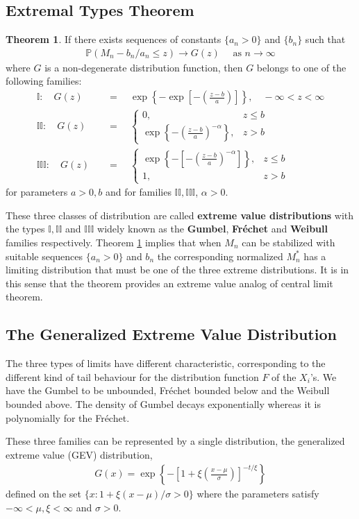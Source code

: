 \documentclass[a4paper,10pt]{article}
\theoremstyle{definition}
\newtheorem{thm}{Theorem}[section]
\numberwithin{equation}{section}
\begin{document}
\subsection{Extremal Types Theorem}

\begin{thm}\label{thm:gfw}
If there exists sequences of constants $\{a_n>0\}$ and $\{b_n\}$ such that 
\begin{align*}
\mathbb{P}(M_n-b_n/a_n \leq z) \to G(z) \quad \text{ as } n \to \infty
\end{align*}
where $G$ is a non-degenerate distribution function, then $G$ belongs to one of the following families:
\begin{align*}
\mathbb{I}:\quad G(z)\quad&= \quad\exp \left\{-\exp\left[-\left(\frac{z-b}{a}\right)\right]\right\}, \quad -\infty<z<\infty\\
\mathbb{II}: \quad G(z)\quad&= \quad\begin{cases}
0, & z \leq b\\
\exp\left\{-\left(\frac{z-b}{a}\right)^{-\alpha}\right\}, &z >b
\end{cases}
\\
\mathbb{III}:\quad G(z)\quad&=  \quad\begin{cases}
\exp\left\{-\left[-\left(\frac{z-b}{a}\right)^{-\alpha}\right]\right\}, & z \leq b\\
1, &z >b
\end{cases}
\end{align*}
for parameters $a>0, b$ and for families $\mathbb{II}, \mathbb{III}$, $\alpha >0$.
\end{thm}
These three classes of distribution are called \textbf{extreme value distributions} with the types $\mathbb{I},\mathbb{II}$ and $\mathbb{III}$ widely known as the \textbf{Gumbel}, \textbf{Fr\'echet} and \textbf{Weibull} families respectively. Theorem \ref{thm:gfw} implies that when $M_n$ can be stabilized with suitable sequences $\{a_n>0\}$ and $b_n$ the corresponding normalized $M_n^\ast$ has a limiting distribution that must be one of the three extreme distributions. It is in this sense that the theorem provides an extreme value analog of central limit theorem.

\subsection{The Generalized Extreme Value Distribution}
The three types of limits have different characteristic, corresponding to the different kind of tail behaviour for the distribution function $F$ of the $X_i$'s. We have the Gumbel to be unbounded, Fr\'echet bounded below and the Weibull bounded above. The density of Gumbel decays exponentially whereas it is polynomially for the Fr\'echet.

These three families can be represented by a single distribution, the generalized extreme value (GEV) distribution,
\begin{align*}
G(x) = \exp \left\{-\left[1+\xi\left(\frac{x-\mu}{\sigma}\right)\right]^{-t/\xi}\right\}
\end{align*}
defined on the set $\{x : 1 + \xi(x-\mu)/\sigma>0\}$ where the parameters satisfy $-\infty<\mu, \xi<\infty$ and $\sigma >0$.
\end{document}
